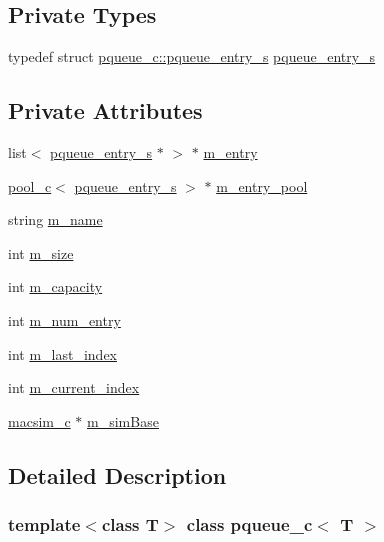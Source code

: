 \subsection*{Private Types}
\begin{DoxyCompactItemize}
\item 
typedef struct \hyperlink{structpqueue__c_1_1pqueue__entry__s}{pqueue\_\-c::pqueue\_\-entry\_\-s} \hyperlink{classpqueue__c_add2d603ebd138e1548106009e724cdc8}{pqueue\_\-entry\_\-s}
\end{DoxyCompactItemize}
\subsection*{Private Attributes}
\begin{DoxyCompactItemize}
\item 
list$<$ \hyperlink{structpqueue__c_1_1pqueue__entry__s}{pqueue\_\-entry\_\-s} $\ast$ $>$ $\ast$ \hyperlink{classpqueue__c_aea1aa5cd5b12ba0c04d8c61444533080}{m\_\-entry}
\item 
\hyperlink{classpool__c}{pool\_\-c}$<$ \hyperlink{structpqueue__c_1_1pqueue__entry__s}{pqueue\_\-entry\_\-s} $>$ $\ast$ \hyperlink{classpqueue__c_a7799f021f9468af506ed33cdde50d54b}{m\_\-entry\_\-pool}
\item 
string \hyperlink{classpqueue__c_ae8a7ef64df724a846fdd99e7662eb7b1}{m\_\-name}
\item 
int \hyperlink{classpqueue__c_afa2a0bf3e21a27c89996394e9d1277d7}{m\_\-size}
\item 
int \hyperlink{classpqueue__c_ab5a781ab6901f00d57787d488c0b6443}{m\_\-capacity}
\item 
int \hyperlink{classpqueue__c_a933bd55083a228754eb47655616f0a6d}{m\_\-num\_\-entry}
\item 
int \hyperlink{classpqueue__c_ac66baa49b33c1c773bd1e2575d814d95}{m\_\-last\_\-index}
\item 
int \hyperlink{classpqueue__c_a9491f48b08d06e57691d8e0d4d06f2ce}{m\_\-current\_\-index}
\item 
\hyperlink{classmacsim__c}{macsim\_\-c} $\ast$ \hyperlink{classpqueue__c_aa5404c8b094541c557fff49dd6421c79}{m\_\-simBase}
\end{DoxyCompactItemize}


\subsection{Detailed Description}
\subsubsection*{template$<$class T$>$ class pqueue\_\-c$<$ T $>$}

